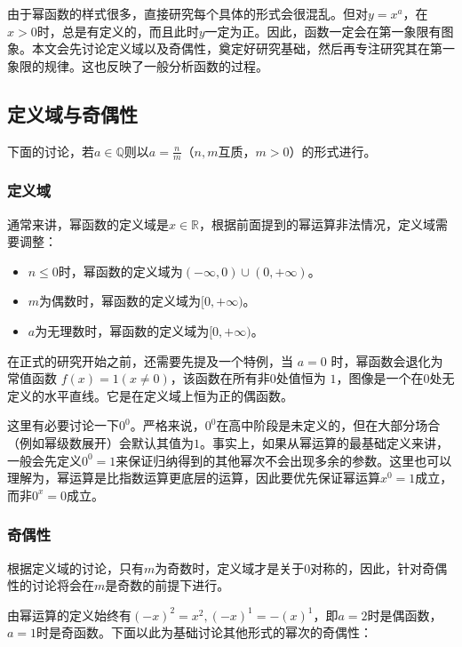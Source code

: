 由于幂函数的样式很多，直接研究每个具体的形式会很混乱。但对$y=x^a$，在$x>0$时，总是有定义的，而且此时$y$一定为正。因此，函数一定会在第一象限有图象。本文会先讨论定义域以及奇偶性，奠定好研究基础，然后再专注研究其在第一象限的规律。这也反映了一般分析函数的过程。

\subsection{定义域与奇偶性}

下面的讨论，若$a\in\mathbb{Q}$则以$\displaystyle a=\frac{n}{m}$（$n,m$互质，$m>0$）的形式进行。

\subsubsection{定义域}

通常来讲，幂函数的定义域是$x\in\mathbb{R}$，根据前面提到的幂运算非法情况，定义域需要调整：

\begin{itemize}
\item $n\leq0$时，幂函数的定义域为$({-\infty},0)\cup(0,{+\infty})$。
\item ${m}$为偶数时，幂函数的定义域为$[0,{+\infty})$。
\item $a$为无理数时，幂函数的定义域为$[0,{+\infty})$。
\end{itemize}

在正式的研究开始之前，还需要先提及一个特例，当 $a = 0$ 时，幂函数会退化为常值函数 $f(x) = 1(x\neq0)$，该函数在所有非$0$处值恒为 $1$，图像是一个在$0$处无定义的水平直线。它是在定义域上恒为正的偶函数。

这里有必要讨论一下$0^0$。严格来说，$0^0$在高中阶段是未定义的，但在大部分场合（例如幂级数展开）会默认其值为$1$。事实上，如果从幂运算的最基础定义来讲，一般会先定义$0^0=1$来保证归纳得到的其他幂次不会出现多余的参数。这里也可以理解为，幂运算是比指数运算更底层的运算，因此要优先保证幂运算$x^0=1$成立，而非$0^x=0$成立。

\subsubsection{奇偶性}

根据定义域的讨论，只有$m$为奇数时，定义域才是关于$0$对称的，因此，针对奇偶性的讨论将会在$m$是奇数的前提下进行。

由幂运算的定义始终有$(-x)^2=x^2,(-x)^1=-(x)^1$，即$a=2$时是偶函数，$a=1$时是奇函数。下面以此为基础讨论其他形式的幂次的奇偶性：

